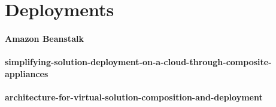 \section{Deployments}

\paragraph{Amazon Beanstalk}
\paragraph{simplifying-solution-deployment-on-a-cloud-through-composite-appliances}
\paragraph{architecture-for-virtual-solution-composition-and-deployment}

